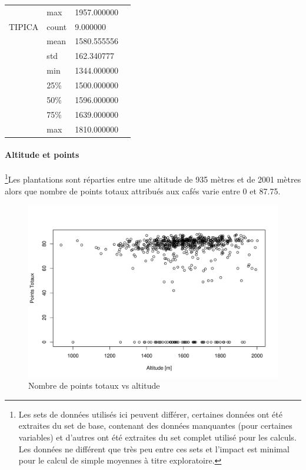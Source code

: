 \begin{table}[H]
\begin{tabular}{llll}
		&max      & 1957.000000                                      &  \\
		TIPICA   & count                                & 9.000000   &  \\
		&mean     & 1580.555556                                      &  \\
		&std      & 162.340777                                       &  \\
		&min      & 1344.000000                                      &  \\
		&25\%     & 1500.000000                                      &  \\
		&50\%     & 1596.000000                                      &  \\
		&75\%     & 1639.000000                                      &  \\
		&max      & 1810.000000            & 
	\end{tabular}
\end{table}
\newpage
\paragraph{Altitude et points} \footnote{Les sets de données utilisés ici peuvent différer, certaines données ont été extraites du set de base, contenant des données manquantes (pour certaines variables) et d'autres ont été extraites du set complet utilisé pour les calculs. Les données ne différent que très peu entre ces sets et l'impact est minimal pour le calcul de simple moyennes à titre exploratoire.}Les plantations sont réparties entre une altitude de 935 mètres et de 2001 mètres alors que nombre de points totaux attribués aux cafés varie entre 0 et 87.75. 

\begin{figure}[H]
	\centering
	\includegraphics[width=0.7\linewidth]{img/Exploration/plotAltitudeVsPuntajeTotal}
	\caption{Nombre de points totaux vs altitude}
	\label{fig:plotaltitudevspuntajetotal}
\end{figure}


